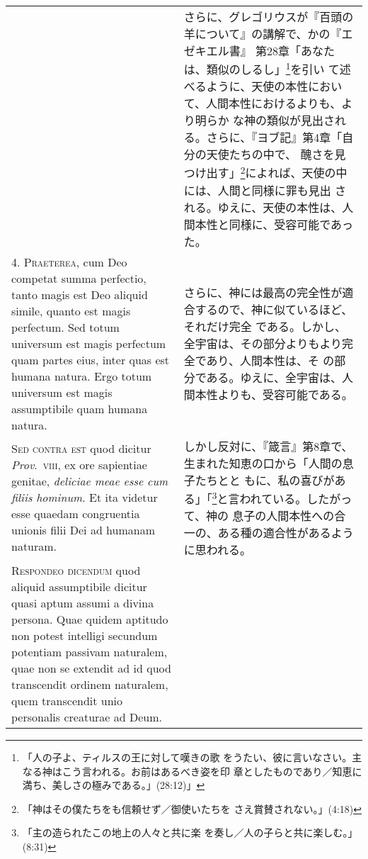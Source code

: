 \documentclass[10pt]{jsarticle} %
\begin{document}
\begin{longtable}{p{21em}p{21em}}
&

さらに、グレゴリウスが『百頭の羊について』の講解で、かの『エゼキエル書』
 第28章「あなたは、類似のしるし」\footnote{「人の子よ、ティルスの王に対して嘆きの歌
 をうたい、彼に言いなさい。主なる神はこう言われる。お前はあるべき姿を印
 章としたものであり／知恵に満ち、美しさの極みである。」(28:12)」}を引い
 て述べるように、天使の本性において、人間本性におけるよりも、より明らか
 な神の類似が見出される。さらに、『ヨブ記』第4章「自分の天使たちの中で、
 醜さを見つけ出す」\footnote{「神はその僕たちをも信頼せず／御使いたちを
 さえ賞賛されない。」(4:18)}によれば、天使の中には、人間と同様に罪も見出
 される。ゆえに、天使の本性は、人間本性と同様に、受容可能であった。





\\



4. {\scshape Praeterea}, cum Deo competat summa perfectio, tanto magis est Deo aliquid
simile, quanto est magis perfectum. Sed totum universum est magis
perfectum quam partes eius, inter quas est humana natura. Ergo totum
universum est magis assumptibile quam humana natura.


&


さらに、神には最高の完全性が適合するので、神に似ているほど、それだけ完全
 である。しかし、全宇宙は、その部分よりもより完全であり、人間本性は、そ
 の部分である。ゆえに、全宇宙は、人間本性よりも、受容可能である。

\\



{\scshape Sed contra est} quod dicitur {\itshape Prov}.~{\scshape viii}, ex ore sapientiae genitae,
{\itshape deliciae meae esse cum filiis hominum}. Et ita videtur esse quaedam
congruentia unionis filii Dei ad humanam naturam.


&


しかし反対に、『箴言』第8章で、生まれた知恵の口から「人間の息子たちとと
 もに、私の喜びがある」「\footnote{「主の造られたこの地上の人々と共に楽
 を奏し／人の子らと共に楽しむ。」(8:31)}と言われている。したがって、神の
 息子の人間本性への合一の、ある種の適合性があるように思われる。

\\



{\scshape Respondeo dicendum} quod aliquid assumptibile dicitur quasi aptum assumi
a divina persona. Quae quidem aptitudo non potest intelligi secundum
potentiam passivam naturalem, quae non se extendit ad id quod
transcendit ordinem naturalem, quem transcendit unio personalis
creaturae ad Deum. 



\end{longtable}
\end{document}
